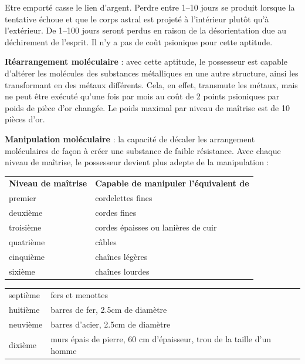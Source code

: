 \documentclass[11pt]{article}
\begin{document}
{\bigskip

Etre emporté casse le lien d'argent. Perdre entre 1--10 jours se produit lorsque la tentative échoue et que le corps astral est projeté à l'intérieur plutôt qu'à l'extérieur. De 1--100 jours seront perdus en raison de la désorientation due au déchirement de l'esprit. Il n'y a pas de coût psionique pour cette aptitude.

\bigskip

\textbf{Réarrangement moléculaire} : avec cette aptitude, le possesseur est capable d'altérer les molécules des substances métalliques en une autre structure, ainsi les transformant en des métaux différents. Cela, en effet, transmute les métaux, mais ne peut être exécuté qu'une fois par mois au coût de 2 points psioniques par poids de pièce d'or changée. Le poids maximal par niveau de maîtrise est de 10 pièces d'or.

\bigskip

\textbf{Manipulation moléculaire} : la capacité de décaler les arrangement moléculaires de façon à créer une substance de faible résistance. Avec chaque niveau de maîtrise, le possesseur devient plus adepte de la manipulation :

\bigskip

\begin{tabular}{>{\centering\arraybackslash}p{3cm}>{\centering\arraybackslash}p{11.7cm}}
\textbf{Niveau de maîtrise} & \textbf{Capable de manipuler l'équivalent de} \\
premier    & cordelettes fines \\
deuxième   & cordes fines \\
troisième  & cordes épaisses ou lanières de cuir\\
quatrième  & câbles \\
cinquième  & chaînes légères \\
sixième    & chaînes lourdes \\
\end{tabular}

\begin{tabular}{>{\centering\arraybackslash}p{3cm}>{\centering\arraybackslash}p{11.7cm}}
septième   & fers et menottes\\
huitième   & barres de fer, 2.5cm de diamètre\\
neuvième   & barres d'acier, 2.5cm de diamètre \\
dixième    & murs épais de pierre, 60 cm d'épaisseur, trou de la taille d'un homme \\
\end{tabular}

}
\end{document}
